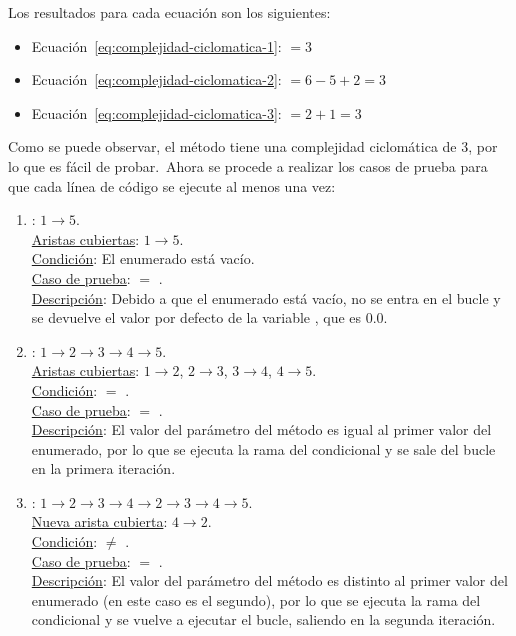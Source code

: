 Los resultados para cada ecuación son los siguientes:

\begin{itemize}
	\item Ecuación~\ref{eq:complejidad-ciclomatica-1}: $= 3$
	\item Ecuación~\ref{eq:complejidad-ciclomatica-2}: $= 6 - 5 + 2 = 3$
	\item Ecuación~\ref{eq:complejidad-ciclomatica-3}: $= 2 + 1 = 3$
\end{itemize}

Como se puede observar, el método tiene una complejidad ciclomática de 3, por lo que es fácil de probar.\ Ahora se
procede a realizar los casos de prueba para que cada línea de código se ejecute al menos una vez:

\begin{enumerate}
	\item {}: $1 \rightarrow 5$.
	\\
	\underline{Aristas cubiertas}: $1 \rightarrow 5$.\\
	\underline{Condición}: El enumerado  está vacío.\\
	\underline{Caso de prueba}:  $=$ .\\
	\underline{Descripción}:
	Debido a que el enumerado está vacío, no se entra en el bucle y se devuelve el valor por defecto de la variable
	, que es $0.0$.

	\item {}: $1 \rightarrow 2 \rightarrow 3 \rightarrow 4 \rightarrow 5$.
	\\
	\underline{Aristas cubiertas}: $1 \rightarrow 2$, $2 \rightarrow 3$, $3 \rightarrow 4$, $4 \rightarrow 5$.\\
	\underline{Condición}:  $=$ .\\
	\underline{Caso de prueba}:  $=$ .\\
	\underline{Descripción}:
	El valor del parámetro del método es igual al primer valor del enumerado,
	por lo que se ejecuta la rama  del condicional y se sale del bucle en la primera iteración.

	\item {}: $1 \rightarrow 2 \rightarrow 3 \rightarrow 4 \rightarrow 2 \rightarrow 3 \rightarrow 4 \rightarrow 5$.
	\\
	\underline{Nueva arista cubierta}: $4 \rightarrow 2$.\\
	\underline{Condición}:  $\neq$ .\\
	\underline{Caso de prueba}:  $=$ .\\
	\underline{Descripción}:
	El valor del parámetro del método es distinto al primer valor del
	enumerado (en este caso es el segundo), por lo que se ejecuta la rama  del condicional y se
	vuelve a ejecutar el bucle, saliendo en la segunda iteración.
\end{enumerate}
\label{itm:casos-prueba-pruebas-unitarias-caja-blanca}

